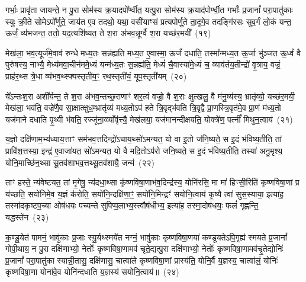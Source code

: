 गर्भाः॒ प्रावृ॑ता जायन्ते॒ न पु॒रा सोम॑स्य क्र॒यादपो᳚र्ण्वीत॒ यत्पु॒रा सोम॑स्य क्र॒याद॑पोर्ण्वी॒त गर्भाः᳚ प्र॒जानां᳚ परा॒पातु॑काः स्युः क्री॒ते सोमे\-ऽपो᳚र्णुते॒ जाय॑त ए॒व तदथो॒ यथा॒ वसी॑याꣳसं प्रत्यपोर्णु॒ते ता॒दृगे॒व तदङ्गि॑रसः सुव॒र्गं लो॒कं यन्त॒ ऊर्जं॒ व्य॑भजन्त॒ ततो॒ यद॒त्यशि॑ष्यत॒ ते श॒रा अ॑भव॒न्नूर्ग्वै श॒रा यच्छ॑र॒मयी᳚~(१९)

मेख॑ला॒ भव॒त्यूर्ज॑मे॒वाव॑ रुन्धे मध्य॒तः सन्न॑ह्यति मध्य॒त ए॒वास्मा॒ ऊर्जं॑ दधाति॒ तस्मा᳚न्मध्य॒त ऊ॒र्जा भु॑ञ्जत ऊ॒र्ध्वं वै पुरु॑षस्य॒ नाभ्यै॒ मेध्य॑मवा॒चीन॑ममे॒ध्यं यन्म॑ध्य॒तः स॒न्नह्य॑ति॒ मेध्यं॑ चै॒वास्या॑मे॒ध्यं च॒ व्याव॑र्तय॒तीन्द्रो॑ वृ॒त्राय॒ वज्रं॒ प्राह॑र॒थ्स त्रे॒धा व्य॑भव॒थ्स्फ्यस्तृती॑य॒ꣳ॒ रथ॒स्तृती॑यं॒ यूप॒स्तृती॑यम्~(२०)

ये᳚\-ऽन्तःश॒रा अशी᳚र्यन्त॒ ते श॒रा अ॑भव॒न्तच्छ॒राणाꣳ॑ शर॒त्वं वज्रो॒ वै श॒राः क्षुत्खलु॒ वै म॑नु॒ष्य॑स्य॒ भ्रातृ॑व्यो॒ यच्छ॑र॒मयी॒ मेख॑ला॒ भव॑ति॒ वज्रे॑णै॒व सा॒क्षात्क्षुध॒म्भ्रातृ॑व्यं मध्य॒तो\-ऽप॑ हते त्रि॒वृद्भ॑वति त्रि॒वृद्वै प्रा॒णस्त्रि॒वृत॑मे॒व प्रा॒णं म॑ध्य॒तो यज॑माने दधाति पृ॒थ्वी भ॑वति॒ रज्जू॑ना॒व्व्याँवृ॑त्त्यै॒ मेख॑लया॒ यज॑मानन्दीक्षयति॒ योक्त्रे॑ण॒ पत्नीं᳚ मिथुन॒त्वाय॑~(२१)

य॒ज्ञो दक्षि॑णाम॒भ्य॑ध्याय॒त्ताꣳ सम॑भव॒त्तदिन्द्रो॑\-ऽचाय॒थ्सो॑\-ऽमन्यत॒ यो वा इ॒तो ज॑नि॒ष्यते॒ स इ॒दं भ॑विष्य॒तीति॒ तां प्रावि॑श॒त्तस्या॒ इन्द्र॑ ए॒वाजा॑यत॒ सो॑\-ऽमन्यत॒ यो वै मदि॒तो\-ऽप॑रो जनि॒ष्यते॒ स इ॒दं भ॑विष्य॒तीति॒ तस्या॑ अनु॒मृश्य॒ योनि॒माच्छि॑न॒थ्सा सू॒तव॑शाभव॒त्तथ्सू॒तव॑शायै॒ जन्म॑~(२२)

ताꣳ हस्ते॒ न्य॑वेष्टयत॒ तां मृ॒गेषु॒ न्य॑दधा॒थ्सा कृ॑ष्णविषा॒णाभ॑व॒दिन्द्र॑स्य॒ योनि॑रसि॒ मा मा॑ हिꣳसी॒रिति॑ कृष्णविषा॒णां प्र य॑च्छति॒ सयो॑निमे॒व य॒ज्ञं क॑रोति॒ सयो॑नि॒न्दक्षि॑णा॒ꣳ॒ सयो॑नि॒मिन्द्रꣳ॑ सयोनि॒त्वाय॑ कृ॒ष्यै त्वा॑ सुस॒स्याया॒ इत्या॑ह॒ तस्मा॑दकृष्टप॒च्या ओष॑धयः पच्यन्ते सुपिप्प॒लाभ्य॒स्त्वौष॑धीभ्य॒ इत्या॑ह॒ तस्मा॒दोष॑धयः॒ फलं॑ गृह्णन्ति॒ यद्धस्ते॑न~(२३)

क॒ण्डू॒येत॑ पामनं॒ भावु॑काः प्र॒जाः स्यु॒र्यथ्स्मये॑त नग्नं॒ भावु॑काः कृष्णविषा॒णया॑ कण्डूयते\-ऽपि॒गृह्य॑ स्मयते प्र॒जानां᳚ गोपी॒थाय॒ न पु॒रा दक्षि॑णाभ्यो॒ नेतोः᳚ कृष्णविषा॒णामव॑ चृते॒द्यत्पु॒रा दक्षि॑णाभ्यो॒ नेतोः᳚ कृष्णविषा॒णामव॑चृ॒तेद्योनिः॑ प्र॒जानां᳚ परा॒पातु॑का स्यान्नी॒तासु॒ दक्षि॑णासु॒ चात्वा॑ले कृष्णविषा॒णां प्रास्य॑ति॒ योनि॒र्वै य॒ज्ञस्य॒ चात्वा॑लं॒ योनिः॑ कृष्णविषा॒णा योना॑वे॒व योनि॑न्दधाति य॒ज्ञस्य॑ सयोनि॒त्वाय॑॥~(२४)

{\anuvakamend[{रु॒न्ध॒ ए॒ष तस्मा᳚च्छर॒मयी॒ यूप॒स्तृती॑यं मिथुन॒त्वाय॒ जन्म॒ हस्ते॑ना॒ष्टाच॑त्वारिꣳशच्च}]}%


